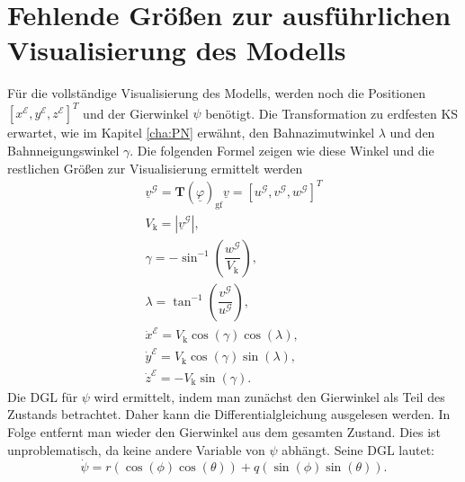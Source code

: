 \section{Fehlende Größen zur ausführlichen Visualisierung des Modells}
\label{sec:Visialisis}
Für die vollständige Visualisierung des Modells, werden noch die Positionen $[x^\mathcal{E},y^\mathcal{E},z^\mathcal{E}]^T$ und der Gierwinkel $\psi$ benötigt.  Die Transformation zu erdfesten KS erwartet, wie im Kapitel \ref{cha:PN} erwähnt, den Bahnazimutwinkel $\lambda$ und den Bahnneigungswinkel $\gamma$. Die folgenden Formel zeigen wie diese Winkel und die restlichen  Größen zur Visualisierung ermittelt werden
\begin{align}
\underline{v}^\mathcal{G} = \textbf{T}(\underline{\varphi})_\mathrm{gf}\underline{v} = [u^\mathcal{G},v^\mathcal{G},w^\mathcal{G}]^T\\
V_\mathrm{k} = |\underline{v}^\mathcal{G}|,\\
\gamma = -\sin^{-1}(\dfrac{w^\mathcal{G}}{V_\mathrm{k}}),\\
\lambda = \tan^{-1}(\dfrac{v^\mathcal{G}}{u^\mathcal{G}}),\\
\dot{x}^\mathcal{E} = V_\mathrm{k}\cos(\gamma)\cos(\lambda),\\
\dot{y}^\mathcal{E} = V_\mathrm{k}\cos(\gamma)\sin(\lambda),\\
\dot{z}^\mathcal{E} = -V_\mathrm{k}\sin(\gamma).
\end{align}
Die DGL für $\psi$ wird ermittelt, indem man zunächst den Gierwinkel als Teil des Zustands betrachtet. Daher kann die Differentialgleichung ausgelesen werden. In Folge entfernt man wieder den Gierwinkel aus dem gesamten Zustand. Dies ist unproblematisch, da keine andere Variable von $\psi$ abhängt. Seine DGL lautet:
\begin{equation}
\dot{\psi} = r(\cos(\phi)\cos(\theta)) + q(\sin(\phi)\sin(\theta)).
\end{equation}

